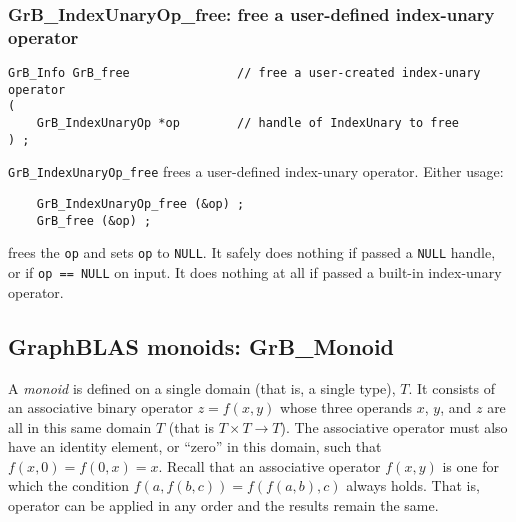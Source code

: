 \documentclass[12pt]{article}
\begin{document}
\subsubsection{{\sf GrB\_IndexUnaryOp\_free:} free a user-defined index-unary operator}
\label{idxunop_free}

\begin{mdframed}[userdefinedwidth=6in]
{\footnotesize
\begin{verbatim}
GrB_Info GrB_free               // free a user-created index-unary operator
(
    GrB_IndexUnaryOp *op        // handle of IndexUnary to free
) ;
\end{verbatim}
}\end{mdframed}

\verb'GrB_IndexUnaryOp_free' frees a user-defined index-unary operator.  Either usage:

    {\small
    \begin{verbatim}
    GrB_IndexUnaryOp_free (&op) ;
    GrB_free (&op) ; \end{verbatim}}

\noindent
frees the \verb'op' and sets \verb'op' to \verb'NULL'.  It safely
does nothing if passed a \verb'NULL' handle, or if \verb'op == NULL' on
input.  It does nothing at all if passed a built-in index-unary operator.


\newpage
\subsection{GraphBLAS monoids: {\sf GrB\_Monoid}} %
\label{monoid}

A {\em monoid} is defined on a single domain (that is, a single type), $T$.  It
consists of an associative binary operator $z=f(x,y)$ whose three operands $x$,
$y$, and $z$ are all in this same domain $T$ (that is $T \times T \rightarrow
T$).  The associative operator must also have an identity element, or ``zero''
in this domain, such that $f(x,0)=f(0,x)=x$.  Recall that an associative
operator $f(x,y)$ is one for which the condition $f(a, f(b,c)) = f(f (a,b),c)$
always holds.  That is, operator can be applied in any order and the results
remain the same.
\end{document}
